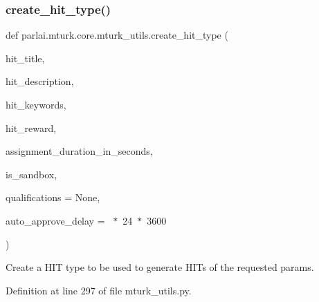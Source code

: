 \subsubsection{\texorpdfstring{create\+\_\+hit\+\_\+type()}{create\_hit\_type()}}
{\footnotesize\ttfamily def parlai.\+mturk.\+core.\+mturk\+\_\+utils.\+create\+\_\+hit\+\_\+type (\begin{DoxyParamCaption}\item[{}]{hit\+\_\+title,  }\item[{}]{hit\+\_\+description,  }\item[{}]{hit\+\_\+keywords,  }\item[{}]{hit\+\_\+reward,  }\item[{}]{assignment\+\_\+duration\+\_\+in\+\_\+seconds,  }\item[{}]{is\+\_\+sandbox,  }\item[{}]{qualifications = {\ttfamily None},  }\item[{}]{auto\+\_\+approve\+\_\+delay = {~$\ast$~24~$\ast$~3600} }\end{DoxyParamCaption})}

\begin{DoxyVerb}Create a HIT type to be used to generate HITs of the requested params.
\end{DoxyVerb}
 

Definition at line 297 of file mturk\+\_\+utils.\+py.


